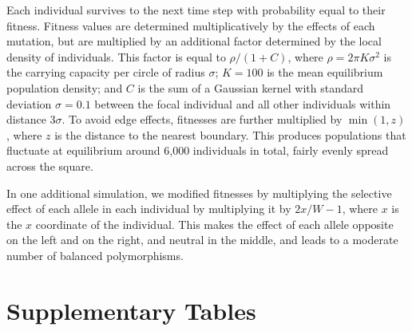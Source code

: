 \documentclass[11pt, oneside]{article}   	%
\newif\ifsubmission
\begin{document}
Each individual survives to the next time step
with probability equal to their fitness.
Fitness values are determined multiplicatively by the effects of each mutation,
but are multiplied by an additional factor determined by the local density of individuals.
This factor is equal to $\rho / (1 + C)$,
where $\rho = 2 \pi K \sigma^2$ is the carrying capacity per circle of radius $\sigma$;
$K=100$ is the mean equilibrium population density;
and $C$ is the sum of a Gaussian kernel with standard deviation $\sigma = 0.1$
between the focal individual and all other individuals within distance $3 \sigma$.
To avoid edge effects, fitnesses are further multiplied by $\min(1, z)$,
where $z$ is the distance to the nearest boundary.
This produces populations that fluctuate at equilibrium around 6,000 individuals in total,
fairly evenly spread across the square.

In one additional simulation, we modified fitnesses by multiplying the selective effect
of each allele in each individual by multiplying it by $2x/W - 1$, 
where $x$ is the $x$ coordinate of the individual.
This makes the effect of each allele opposite on the left and on the right,
and neutral in the middle,
and leads to a moderate number of balanced polymorphisms.


\ifsubmission
    \listoffigures
    \clearpage
\fi

\section{Supplementary Tables}
\end{document}

